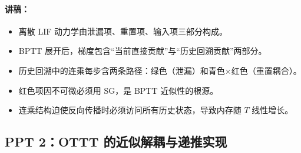 \documentclass[journal,12pt,onecolumn]{IEEEtran}
\begin{document}
\paragraph{\textbf{讲稿：}}
\begin{itemize}
    \item 离散 LIF 动力学由泄漏项、重置项、输入项三部分构成。
    \item BPTT 展开后，梯度包含“当前直接贡献”与“历史回溯贡献”两部分。
    \item 历史回溯中的连乘每步含两条路径：绿色（泄漏）和青色×红色（重置耦合）。
    \item 红色项因不可微必须用 SG，是 BPTT 近似性的根源。
    \item 连乘结构迫使反向传播时必须访问所有历史状态，导致内存随 \(T\) 线性增长。
\end{itemize}

\subsection*{PPT 2：OTTT 的近似解耦与递推实现}
\end{document}
